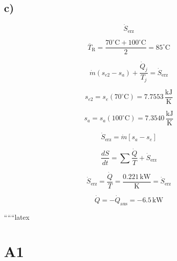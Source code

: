 

\subsection*{c)}

\[
\dot{S}_{\text{erz}}
\]

\[
\overline{T}_{\text{R}} = \frac{70^\circ \text{C} + 100^\circ \text{C}}{2} = 85^\circ \text{C}
\]

\[
\dot{m} (s_{e2} - s_{a}) + \frac{\dot{Q}_j}{T_j} = \dot{S}_{\text{erz}}
\]

\[
s_{e2} = s_e (70^\circ \text{C}) = 7.7553 \, \frac{\text{kJ}}{\text{K}}
\]

\[
s_{a} = s_a (100^\circ \text{C}) = 7.3540 \, \frac{\text{kJ}}{\text{K}}
\]

\[
\dot{S}_{\text{erz}} = \dot{m} [s_a - s_e]
\]

\[
\frac{dS}{dt} = \sum \frac{\dot{Q}}{T} + \dot{S}_{\text{erz}}
\]

\[
\dot{S}_{\text{erz}} = \frac{\dot{Q}}{T} = \frac{0.221 \, \text{kW}}{\text{K}} = \dot{S}_{\text{erz}}
\]

\[
\dot{Q} = -\dot{Q}_{\text{aus}} = -6.5 \, \text{kW}
\]

``````latex


\section*{A1}